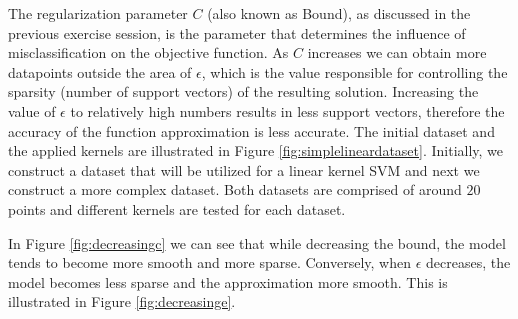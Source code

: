 \documentclass[a4paper, 11pt, one column]{article}
\begin{document}
The regularization parameter $C$ (also known as Bound), as discussed in the previous exercise session, is the parameter that determines the influence of misclassification on the objective function. As $C$ increases we can obtain more datapoints outside the area of $\epsilon$, which is the value responsible for controlling the sparsity (number of support vectors) of the resulting solution. Increasing the value of $\epsilon$ to relatively high numbers results in less support vectors, therefore the accuracy of the function approximation is less accurate. 
The initial dataset and the applied kernels are illustrated in Figure \ref{fig:simplelineardataset}.
Initially, we construct a dataset that will be utilized for a linear kernel SVM and next we construct a more complex dataset. Both datasets are comprised of around $20$ points and different kernels are tested for each dataset. 

In Figure \ref{fig:decreasingc} we can see that while decreasing the bound, the model tends to become more smooth and more sparse. Conversely, when $\epsilon$ decreases, the model becomes less sparse and the approximation more smooth. This is illustrated in Figure \ref{fig:decreasinge}.  
\end{document}
